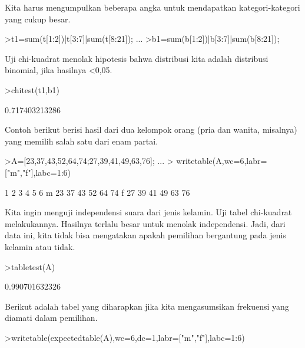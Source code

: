 \documentclass[a4paper,10pt]{article}
\begin{document}
\begin{eulernotebook}
\begin{eulerprompt}
\end{eulerprompt}
\begin{eulercomment}
Kita harus mengumpulkan beberapa angka untuk mendapatkan
kategori-kategori yang cukup besar.
\end{eulercomment}
\begin{eulerprompt}
>t1=sum(t[1:2])|t[3:7]|sum(t[8:21]); ...
>b1=sum(b[1:2])|b[3:7]|sum(b[8:21]);
\end{eulerprompt}
\begin{eulercomment}
Uji chi-kuadrat menolak hipotesis bahwa distribusi kita adalah
distribusi binomial, jika hasilnya \textless{}0,05.
\end{eulercomment}
\begin{eulerprompt}
>chitest(t1,b1)
\end{eulerprompt}
\begin{euleroutput}
  0.717403213286
\end{euleroutput}
\begin{eulercomment}
Contoh berikut berisi hasil dari dua kelompok orang (pria dan wanita,
misalnya) yang memilih salah satu dari enam partai.
\end{eulercomment}
\begin{eulerprompt}
>A=[23,37,43,52,64,74;27,39,41,49,63,76];  ...
>  writetable(A,wc=6,labr=["m","f"],labc=1:6)
\end{eulerprompt}
\begin{euleroutput}
             1     2     3     4     5     6
       m    23    37    43    52    64    74
       f    27    39    41    49    63    76
\end{euleroutput}
\begin{eulercomment}
Kita ingin menguji independensi suara dari jenis kelamin. Uji tabel
chi-kuadrat melakukannya. Hasilnya terlalu besar untuk menolak
independensi. Jadi, dari data ini, kita tidak bisa mengatakan apakah
pemilihan bergantung pada jenis kelamin atau tidak.
\end{eulercomment}
\begin{eulerprompt}
>tabletest(A)
\end{eulerprompt}
\begin{euleroutput}
  0.990701632326
\end{euleroutput}
\begin{eulercomment}
Berikut adalah tabel yang diharapkan jika kita mengasumsikan frekuensi
yang diamati dalam pemilihan.
\end{eulercomment}
\begin{eulerprompt}
>writetable(expectedtable(A),wc=6,dc=1,labr=["m","f"],labc=1:6)

\end{eulerprompt}
\end{eulernotebook}
\end{document}
